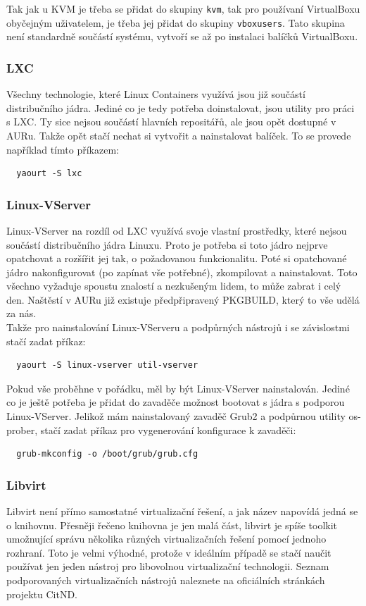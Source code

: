 Tak jak u KVM je třeba se přidat do skupiny \texttt{kvm}, tak pro používaní VirtualBoxu obyčejným uživatelem, je třeba jej přidat do skupiny \texttt{vboxusers}. Tato skupina není standardně součástí systému, vytvoří se až po instalaci balíčků VirtualBoxu.
\subsubsection{LXC}
Všechny technologie, které Linux Containers využívá jsou již součástí distribučního jádra. Jediné co je tedy potřeba doinstalovat, jsou utility pro práci s LXC. Ty sice nejsou součástí hlavních repositářů, ale jsou opět dostupné v AURu. Takže opět stačí nechat si vytvořit a nainstalovat balíček. To se provede například tímto příkazem:
\begin{verbatim}
  yaourt -S lxc
\end{verbatim}
\subsubsection{Linux-VServer}
Linux-VServer na rozdíl od LXC využívá svoje vlastní prostředky, které nejsou součástí distribučního jádra Linuxu. Proto je potřeba si toto jádro nejprve opatchovat a rozšířit jej tak, o požadovanou funkcionalitu. Poté si opatchované jádro nakonfigurovat (po zapínat vše potřebné), zkompilovat a nainstalovat. Toto všechno vyžaduje spoustu znalostí a nezkušeným lidem, to může zabrat i celý den. Naštěstí v AURu již existuje předpřipravený PKGBUILD, který to vše udělá za nás.
\\
Takže pro nainstalování Linux-VServeru a podpůrných nástrojů i se závislostmi stačí zadat příkaz:
\begin{verbatim}
  yaourt -S linux-vserver util-vserver 
\end{verbatim}

Pokud vše proběhne v pořádku, měl by být Linux-VServer nainstalován. Jediné co je ještě potřeba je přidat do zavaděče možnost bootovat s jádra s podporou Linux-VServer.
Jelikož mám nainstalovaný zavaděč Grub2 a podpůrnou utility os-prober, stačí zadat příkaz pro vygenerování konfigurace k zavaděči:
\begin{verbatim}
  grub-mkconfig -o /boot/grub/grub.cfg 
\end{verbatim}
\subsubsection{Libvirt}
Libvirt není přímo samostatné virtualizační řešení, a jak název napovídá jedná se o knihovnu. Přesněji řečeno knihovna je jen malá část, libvirt je spíše toolkit umožnující správu několika různých virtualizačních řešení pomocí jednoho rozhraní. Toto je velmi výhodné, protože v ideálním případě se stačí naučit používat jen jeden nástroj pro libovolnou virtualizační technologii. Seznam podporovaných virtualizačních nástrojů naleznete na oficiálních stránkách projektu CitND.

